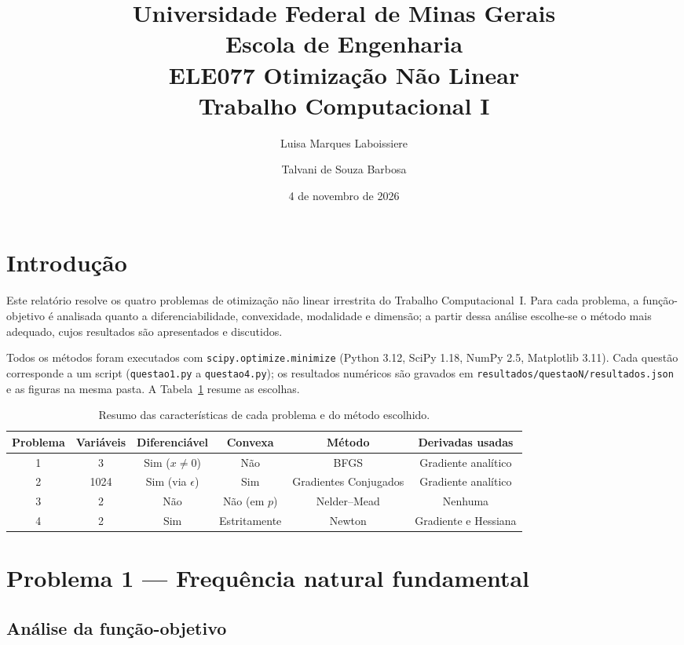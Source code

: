 \documentclass[12pt,a4paper]{article}
\title{{\footnotesize Universidade Federal de Minas Gerais\\Escola de Engenharia\\ELE077 Otimização Não Linear\\} \vspace{5mm} Trabalho Computacional I}
\author{Luisa Marques Laboissiere \and Talvani de Souza Barbosa}
\date{4 de novembro de 2026}
\begin{document}
\maketitle

\section*{Introdução}

Este relatório resolve os quatro problemas de otimização não linear irrestrita do Trabalho Computacional~I. Para cada problema, a função-objetivo é analisada quanto a diferenciabilidade, convexidade, modalidade e dimensão; a partir dessa análise escolhe-se o método mais adequado, cujos resultados são apresentados e discutidos.

Todos os métodos foram executados com \texttt{scipy.optimize.minimize} (Python 3.12, SciPy 1.18, NumPy 2.5, Matplotlib 3.11). Cada questão corresponde a um script (\texttt{questao1.py} a \texttt{questao4.py}); os resultados numéricos são gravados em \texttt{resultados/questaoN/resultados.json} e as figuras na mesma pasta. A Tabela~\ref{tab:resumo} resume as escolhas.

\begin{table}[H]
\centering
\caption{Resumo das características de cada problema e do método escolhido.}
\label{tab:resumo}
\begin{tabular}{@{}cccccc@{}}
\toprule
Problema & Variáveis & Diferenciável & Convexa & Método & Derivadas usadas \\
\midrule
1 & 3    & Sim ($x\neq 0$) & Não  & BFGS          & Gradiente analítico \\
2 & 1024 & Sim (via $\epsilon$) & Sim & Gradientes Conjugados & Gradiente analítico \\
3 & 2    & Não             & Não (em $p$) & Nelder--Mead & Nenhuma \\
4 & 2    & Sim             & Estritamente & Newton & Gradiente e Hessiana \\
\bottomrule
\end{tabular}
\end{table}

\section{Problema 1 --- Frequência natural fundamental}

\subsection{Análise da função-objetivo}
\end{document}
